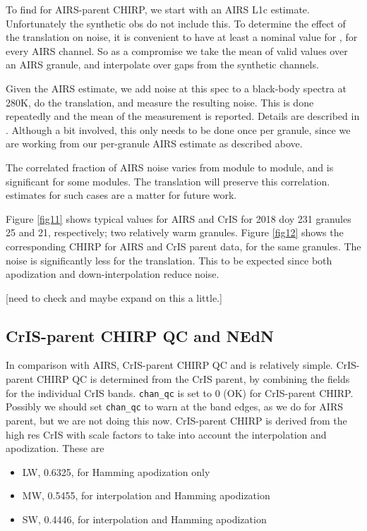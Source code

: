 \documentclass[12pt]{article}
\begin{document}
To find {\nedn} for AIRS-parent CHIRP, we start with an AIRS L1c
{\nedn} estimate.  Unfortunately the synthetic obs do not include
this.  To determine the effect of the translation on noise, it is
convenient to have at least a nominal value for {\nedn}, for every
AIRS channel.  So as a compromise we take the mean of valid {\nedn}
values over an AIRS granule, and interpolate over gaps from the
synthetic channels.

Given the AIRS estimate, we add noise at this spec to a black-body
spectra at 280K, do the translation, and measure the resulting
noise.  This is done repeatedly and the mean of the measurement is
reported.  Details are described in \cite{mott2018}.  Although a bit
involved, this only needs to be done once per granule, since we are
working from our per-granule AIRS estimate as described above.

The correlated fraction of AIRS noise varies from module to module,
and is significant for some modules.  The translation will preserve
this correlation.  {\nedn} estimates for such cases are a matter for
future work.

Figure \ref{fig11} shows typical values for AIRS and CrIS {\nedn}
for 2018 doy 231 granules 25 and 21, respectively; two relatively
warm granules.  Figure \ref{fig12} shows the corresponding CHIRP
{\nedn} for AIRS and CrIS parent data, for the same granules.
The noise is significantly less for the translation.  This to be
expected since both apodization and down-interpolation reduce noise.

[need to check and maybe expand on this a little.]

\subsection{CrIS-parent CHIRP QC and NEdN}

In comparison with AIRS, CrIS-parent CHIRP QC and {\nedn} is
relatively simple.  CrIS-parent CHIRP QC is determined from the CrIS
parent, by combining the fields for the individual CrIS bands.
\texttt{chan\_qc} is set to 0 (OK) for CrIS-parent CHIRP.  Possibly
we should set \texttt{chan\_qc} to warn at the band edges, as we do
for AIRS parent, but we are not doing this now.  CrIS-parent CHIRP
{\nedn} is derived from the high res CrIS {\nedn} with scale factors
to take into account the interpolation and apodization.  These are
\begin{itemize}
   \item LW, 0.6325, for Hamming apodization only
   \item MW, 0.5455, for interpolation and Hamming apodization
   \item SW, 0.4446, for interpolation and Hamming apodization
\end{itemize}



\end{document}

